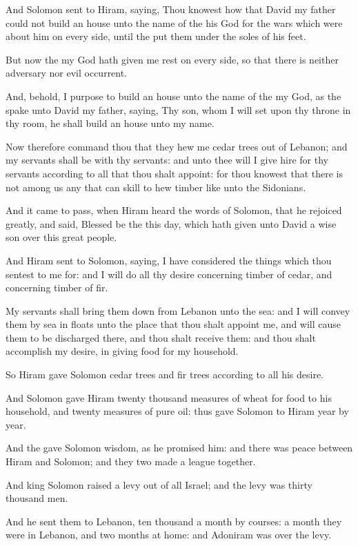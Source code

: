 \Verse And Solomon sent to Hiram, saying, \Verse Thou knowest how that David my father could not build an house unto the name of the \LORD his God for the wars which were about him on every side, until the \LORD put them under the soles of his feet.

\Verse But now the \LORD my God hath given me rest on every side, so that there is neither adversary nor evil occurrent.

\Verse And, behold, I purpose to build an house unto the name of the \LORD my God, as the \LORD spake unto David my father, saying, Thy son, whom I will set upon thy throne in thy room, he shall build an house unto my name.

\Verse Now therefore command thou that they hew me cedar trees out of Lebanon; and my servants shall be with thy servants: and unto thee will I give hire for thy servants according to all that thou shalt appoint: for thou knowest that there is not among us any that can skill to hew timber like unto the Sidonians.

\Verse And it came to pass, when Hiram heard the words of Solomon, that he rejoiced greatly, and said, Blessed be the \LORD this day, which hath given unto David a wise son over this great people.

\Verse And Hiram sent to Solomon, saying, I have considered the things which thou sentest to me for: and I will do all thy desire concerning timber of cedar, and concerning timber of fir.

\Verse My servants shall bring them down from Lebanon unto the sea: and I will convey them by sea in floats unto the place that thou shalt appoint me, and will cause them to be discharged there, and thou shalt receive them: and thou shalt accomplish my desire, in giving food for my household.

\Verse So Hiram gave Solomon cedar trees and fir trees according to all his desire.

\Verse And Solomon gave Hiram twenty thousand measures of wheat for food to his household, and twenty measures of pure oil: thus gave Solomon to Hiram year by year.

\Verse And the \LORD gave Solomon wisdom, as he promised him: and there was peace between Hiram and Solomon; and they two made a league together.

\Verse And king Solomon raised a levy out of all Israel; and the levy was thirty thousand men.

\Verse And he sent them to Lebanon, ten thousand a month by courses: a month they were in Lebanon, and two months at home: and Adoniram was over the levy.

